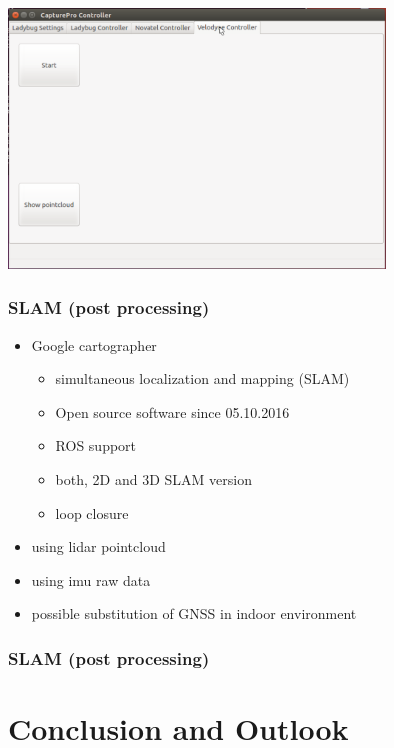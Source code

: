\documentclass[aspectratio=169]{beamer}
\begin{document}
  \begin{frame}
   \begin{center}
    \includegraphics[width=10cm]{./Abbildungen/GUI_4.png}
   \end{center}
  \end{frame}
  
  \begin{frame}
   \frametitle{SLAM (post processing)}
   \begin{itemize} 
    \item Google cartographer
    \begin{itemize}
     \item simultaneous localization and mapping (SLAM)
     \item Open source software since 05.10.2016
     \item ROS support
     \item both, 2D and 3D SLAM version
     \item loop closure
     \cite{Hess2016}
    \end{itemize}
    \item using lidar pointcloud
    \item using imu raw data
    \item possible substitution of GNSS in indoor environment
   \end{itemize}
  \end{frame}
  
  \begin{frame}
   \frametitle{SLAM (post processing)}
  \end{frame}



\section{Conclusion and Outlook}
\end{document}
